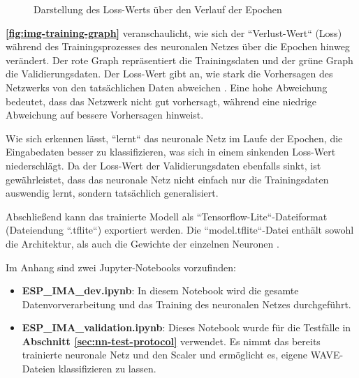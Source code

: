 \begin{figure} %
	\vspace{-20pt + 0.02\textwidth}
	\caption{Darstellung des Loss-Werts über den Verlauf der Epochen}
	\label{fig:img-training-graph}
\end{figure}

\textbf{\autoref{fig:img-training-graph}} veranschaulicht, wie sich der ``Verlust-Wert`` (Loss) während des Trainingsprozesses des neuronalen Netzes über die Epochen hinweg verändert. Der rote Graph repräsentiert die Trainingsdaten und der grüne Graph die Validierungsdaten. Der Loss-Wert gibt an, wie stark die Vorhersagen des Netzwerks von den tatsächlichen Daten abweichen \cite{neural-network-basics}. Eine hohe Abweichung bedeutet, dass das Netzwerk nicht gut vorhersagt, während eine niedrige Abweichung auf bessere Vorhersagen hinweist.

Wie sich erkennen lässt, ``lernt`` das neuronale Netz im Laufe der Epochen, die Eingabedaten besser zu klassifizieren, was sich in einem sinkenden Loss-Wert niederschlägt. Da der Loss-Wert der Validierungsdaten ebenfalls sinkt, ist gewährleistet, dass das neuronale Netz nicht einfach nur die Trainingsdaten auswendig lernt, sondern tatsächlich generalisiert.

Abschließend kann das trainierte Modell als ``Tensorflow-Lite``-Dateiformat (Dateiendung ``.tflite``) exportiert werden. Die ``model.tflite``-Datei enthält sowohl die Architektur, als auch die Gewichte der einzelnen Neuronen \cite{tflite-file}.

Im Anhang sind zwei Jupyter-Notebooks vorzufinden:
\begin{itemize}
  \item \textbf{ESP\_IMA\_dev.ipynb}: In diesem Notebook wird die gesamte Datenvorverarbeitung und das Training des neuronalen Netzes durchgeführt.
  \item \textbf{ESP\_IMA\_validation.ipynb}: Dieses Notebook wurde für die Testfälle in \textbf{Abschnitt \ref{sec:nn-test-protocol}} verwendet. Es nimmt das bereits trainierte neuronale Netz und den Scaler und ermöglicht es, eigene WAVE-Dateien klassifizieren zu lassen.
\end{itemize}

